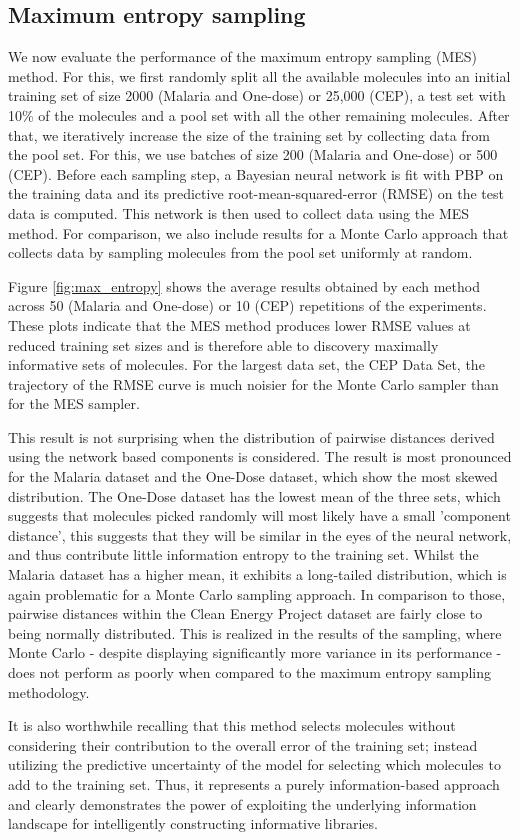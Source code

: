 \subsection{Maximum entropy sampling}

We now evaluate the performance of the maximum entropy sampling (MES) method. For this, we first randomly split all the available molecules into an initial training set of size 2000 (Malaria and One-dose) or 25,000 (CEP), a test set with 10\% of the molecules and a pool set with all the other remaining molecules. After that, we iteratively increase the size of the training set by collecting data from the pool set. For this, we use batches of size 200 (Malaria and One-dose) or 500 (CEP). Before each sampling step, a Bayesian neural network is fit with PBP on the training data and its predictive root-mean-squared-error (RMSE) on the test data is computed. This network is then used to collect data using the MES method. For comparison, we also include results for a Monte Carlo approach that collects data by sampling molecules from the pool set uniformly at random.

Figure \ref{fig:max_entropy} shows the average results obtained by each method across 50 (Malaria and One-dose) or 10 (CEP) repetitions of the experiments. These plots indicate that the MES method produces lower RMSE values at reduced training set sizes and is therefore able to discovery maximally informative sets of molecules. For the largest data set, the CEP Data Set, the trajectory of the RMSE curve is much noisier for the Monte Carlo sampler than for the MES sampler.

This result is not surprising when the distribution of pairwise distances derived using the network based components is considered. The result is most pronounced for the Malaria dataset and the One-Dose dataset, which show the most skewed distribution.  The One-Dose dataset has the lowest mean of the three sets, which suggests that molecules picked randomly will most likely have a small 'component distance', this suggests that they will be similar in the eyes of the neural network, and thus contribute little information entropy to the training set. Whilst the Malaria dataset has a higher mean, it exhibits a long-tailed distribution, which is again problematic for a Monte Carlo sampling approach.  In comparison to those, pairwise distances within the Clean Energy Project dataset are fairly close to being normally distributed.  This is realized in the results of the sampling, where Monte Carlo - despite displaying significantly more variance in its performance - does not perform as poorly when compared to the maximum entropy sampling methodology.

It is also worthwhile recalling that this method selects molecules without considering their contribution to the overall error of the training set; instead utilizing the predictive uncertainty of the model for selecting which molecules to add to the training set. Thus, it represents a purely information-based approach and clearly demonstrates the power of exploiting the underlying information landscape for intelligently constructing informative libraries.